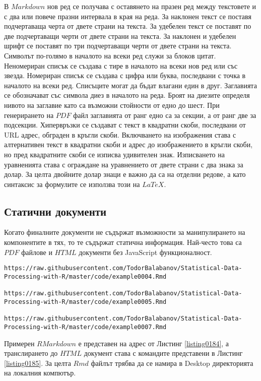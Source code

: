 В $Markdown$ нов ред се получава с оставянето на празен ред между текстовете и с два или повече празни интервала в края на реда. За наклонен текст се поставя подчертаваща черта от двете страни на текста. За удебелен текст се поставят по две подчертаващи черти от двете страни на текста. За наклонен и удебелен шрифт се поставят по три подчертаващи черти от двете страни на текста. Символът по-голямо в началото на всеки ред служи за блоков цитат. Неномериран списък се създава с тире в началото на всеки нов ред или със звезда. Номериран списък се създава с цифра или буква, последвани с точка в началото на всеки ред. Списъците могат да бъдат влагани един в друг. Заглавията се обозначават със символа диез в началото на реда. Броят на диезите определя нивото на заглавие като са възможни стойности от едно до шест. При генерирането на $PDF$ файл заглавията от ранг едно са за секции, а от ранг две за подсекции. Хипервръзки се създават с текст в квадратни скоби, последвани от URL адрес, обграден в кръгли скоби. Включването на изображения става с алтернативен текст в квадратни скоби и адрес до изображението в кръгли скоби, но пред квадратните скоби се изписва удивителен знак. Изписването на уравненията става с ограждане на уравнението от двете страни с два знака за долар. За целта двойните долар знаци е важно да са на отделни редове, а като синтаксис за формулите се използва този на $LaTeX$. 

\subsection{Статични документи}

Когато финалните документи не съдържат възможности за манипулирането на компонентите в тях, то те съдържат статична информация. Най-често това са $PDF$ файлове и $HTML$ документи без JavaScript функционалност.

\begin{lstlisting}[caption=Адрес на примерни RMarkdown документ, label=listing0184]
https://raw.githubusercontent.com/TodorBalabanov/Statistical-Data-Processing-with-R/master/code/example0004.Rmd

https://raw.githubusercontent.com/TodorBalabanov/Statistical-Data-Processing-with-R/master/code/example0005.Rmd

https://raw.githubusercontent.com/TodorBalabanov/Statistical-Data-Processing-with-R/master/code/example0007.Rmd
\end{lstlisting}

Примерен $RMarkdown$ е представен на адрес от Листинг \ref{listing0184}, а транслирането до $HTML$ документ става с командите представени в Листинг \ref{listing0185}. За целта $Rmd$ файлът трябва да се намира в Desktop директорията на локалния компютър. 

